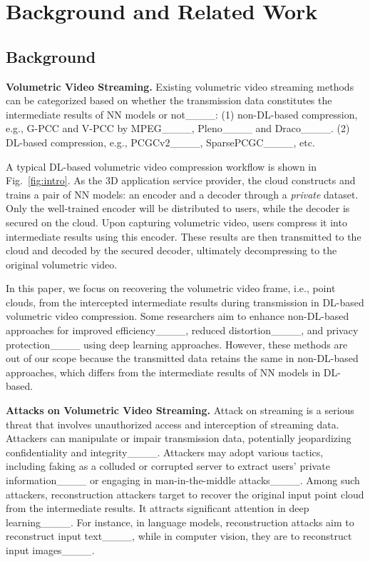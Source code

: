\section{Background and Related Work}
\subsection{Background}
\textbf{Volumetric Video Streaming.}
Existing volumetric video streaming methods can be categorized based on whether the transmission data constitutes the intermediate results of NN models or not____:
(1) non-DL-based compression, e.g., G-PCC and V-PCC by MPEG____, Pleno____
and Draco____.
(2) DL-based compression, e.g., PCGCv2____, SparsePCGC____, etc.

A typical DL-based volumetric video compression workflow is shown in Fig.~\ref{fig:intro}. As the 3D application service provider, the cloud constructs and trains a pair of NN models: an encoder and a decoder through a \textit{private} dataset. Only the well-trained encoder will be distributed to users, while the decoder is secured on the cloud. Upon capturing volumetric video, users compress it into intermediate results using this encoder. These results are then transmitted to the cloud and decoded by the secured decoder, ultimately decompressing to the original volumetric video. 

In this paper, we focus on recovering the volumetric video frame, i.e., point clouds, from the intercepted intermediate results during transmission in DL-based volumetric video compression.
Some researchers aim to enhance non-DL-based approaches for improved efficiency____, reduced distortion____, and privacy protection____ using deep learning approaches. However, these methods are out of our scope because the transmitted data retains the same in non-DL-based approaches, which differs from the intermediate results of NN models in DL-based.

\noindent\textbf{Attacks on Volumetric Video Streaming.}
Attack on streaming is a serious threat that involves unauthorized access and interception of streaming data. Attackers can manipulate or impair transmission data, potentially jeopardizing confidentiality and integrity____.
Attackers may adopt various tactics, including faking as a colluded or corrupted server to extract users' private information____ or engaging in man-in-the-middle attacks____. 
Among such attackers, reconstruction attackers target to recover the original input point cloud from the intermediate results. It attracts significant attention in deep learning____. For instance, in language models, reconstruction attacks aim to reconstruct input text____, while in computer vision, they are to reconstruct input images____. 

